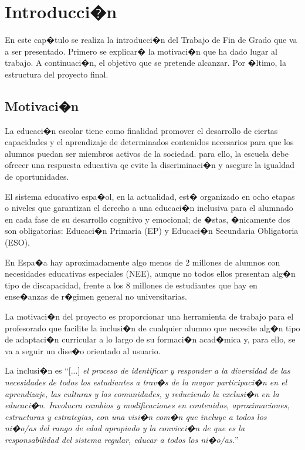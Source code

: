 %
%

\chapter{Introducci�n}

\begin{resumen}
En este cap�tulo se realiza la introducci�n del Trabajo de Fin de Grado que va a ser presentado. Primero se explicar� la motivaci�n que ha dado lugar al trabajo. A continuaci�n, el objetivo que se pretende alcanzar. Por �ltimo, la estructura del proyecto final.
\end{resumen}


\section{Motivaci�n}
La educaci�n escolar tiene como finalidad promover el desarrollo de ciertas capacidades y el aprendizaje de determinados contenidos necesarios para que los alumnos puedan ser miembros activos de la sociedad. para ello, la escuela debe ofrecer una respuesta educativa qe evite la discriminaci�n y asegure la igualdad de oportunidades.

El sistema educativo espa�ol, en la actualidad, est� organizado en ocho etapas o niveles que garantizan el derecho a una educaci�n inclusiva para el alumnado en cada fase de su desarrollo cognitivo y emocional; de �stas, �nicamente dos son obligatorias: Educaci�n Primaria (EP) y Educaci�n Secundaria Obligatoria (ESO). 

En Espa�a hay aproximadamente algo menos de 2 millones de alumnos con necesidades educativas especiales (NEE), aunque no todos ellos presentan alg�n tipo de discapacidad, frente a los 8 millones de estudiantes que hay en ense�anzas de r�gimen general no universitarias.

La motivaci�n del proyecto es proporcionar una herramienta de trabajo para el profesorado que facilite la inclusi�n de cualquier alumno que necesite alg�n tipo de adaptaci�n curricular a lo largo de su formaci�n acad�mica y, para ello, se va a seguir un dise�o orientado al usuario.

La inclusi�n es ``[...]\textit{ el proceso de identificar y responder a la diversidad de las necesidades de todos los estudiantes a trav�s de la mayor participaci�n en el aprendizaje, las culturas y las comunidades, y reduciendo la exclusi�n en la educaci�n. Involucra cambios y modificaciones en contenidos, aproximaciones, estructuras y estrategias, con una visi�n com�n que incluye a todos los ni�o/as del rango de edad apropiado y la convicci�n de que es la responsabilidad del sistema regular, educar a todos los ni�o/as.}''


